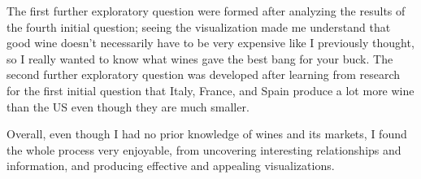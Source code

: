 The first further exploratory question were formed after analyzing the results of the fourth initial question; seeing the visualization made me understand that good wine doesn't necessarily have to be very expensive like I previously thought, so I really wanted to know what wines gave the best bang for your buck. The second further exploratory question was developed after learning from research for the first initial question that Italy, France, and Spain produce a lot more wine than the US even though they are much smaller.

Overall, even though I had no prior knowledge of wines and its markets, I found the whole process very enjoyable, from uncovering interesting relationships and information, and producing effective and appealing visualizations.
    
\printbibliography